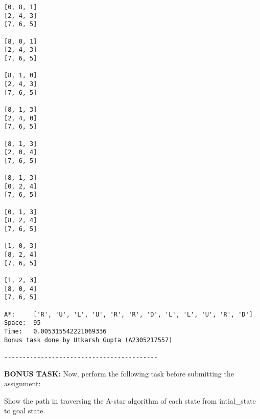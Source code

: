 \documentclass[11pt]{article}
\begin{document}
\begin{Verbatim}[commandchars=\\\{\}]
[0, 8, 1]
[2, 4, 3]
[7, 6, 5]

[8, 0, 1]
[2, 4, 3]
[7, 6, 5]

[8, 1, 0]
[2, 4, 3]
[7, 6, 5]

[8, 1, 3]
[2, 4, 0]
[7, 6, 5]

[8, 1, 3]
[2, 0, 4]
[7, 6, 5]

[8, 1, 3]
[0, 2, 4]
[7, 6, 5]

[0, 1, 3]
[8, 2, 4]
[7, 6, 5]

[1, 0, 3]
[8, 2, 4]
[7, 6, 5]

[1, 2, 3]
[8, 0, 4]
[7, 6, 5]

A*:     ['R', 'U', 'L', 'U', 'R', 'R', 'D', 'L', 'L', 'U', 'R', 'D']
Space:  95
Time:   0.005315542221069336
Bonus task done by Utkarsh Gupta (A2305217557)

------------------------------------------
    \end{Verbatim}

    \textbf{BONUS TASK:} Now, perform the following task before submitting
the assignment:

Show the path in traversing the A-star algorithm of each state from
intial\_state to goal state.


    
    
    
\end{document}

